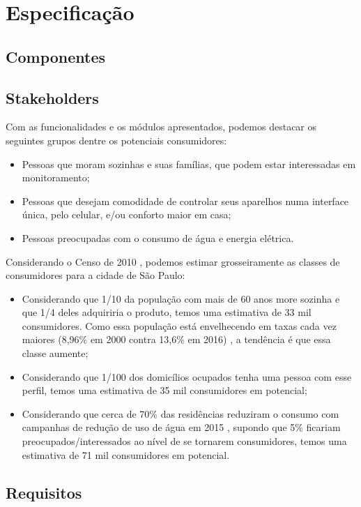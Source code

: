 \chapter{Especificação}

\section{Componentes}

\section{Stakeholders}
Com as funcionalidades e os módulos apresentados, podemos destacar os seguintes grupos dentre os potenciais consumidores:

\begin{itemize}
\item Pessoas que moram sozinhas e suas famílias, que podem estar interessadas em monitoramento;
\item Pessoas que desejam comodidade de controlar seus aparelhos numa interface única, pelo celular, e/ou conforto maior em casa;
\item Pessoas preocupadas com o consumo de água e energia elétrica.
\end{itemize}

Considerando o Censo de 2010 \cite{ibge}, podemos estimar grosseiramente as classes de consumidores para a cidade de São Paulo:

\begin{itemize}
\item Considerando que 1/10 da população com mais de 60 anos more sozinha e que 1/4 deles adquiriria o produto, temos uma estimativa de 33 mil consumidores. Como essa população está envelhecendo em taxas cada vez maiores (8,96\% em 2000 contra 13,6\% em 2016) \cite{bibliotecaVirtual}, a tendência é que essa classe aumente;
\item Considerando que 1/100 dos domicílios ocupados tenha uma pessoa com esse perfil, temos uma estimativa de 35 mil consumidores em potencial;
\item Considerando que cerca de 70\% das residências reduziram o consumo com campanhas de redução de uso de água em 2015 \cite{g1}, supondo que 5\% ficariam preocupados/interessados ao nível de se tornarem consumidores, temos uma estimativa de 71 mil consumidores em potencial.
\end{itemize}

\section{Requisitos}

